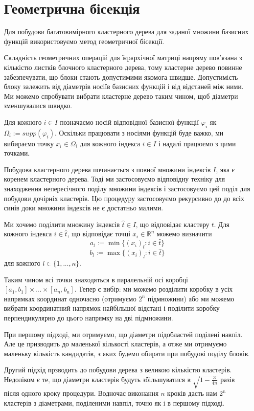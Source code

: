 \documentclass[12pt]{report}
\begin{document}
 	\section{Геометрична бісекція}
	\hspace{0.8cm} Для побудови багатовимірного кластерного дерева для заданої множини базисних функцій використовуємо метод геометричної бісекції.
	\par Складність геометричних операцій для їєрархічної матриці напряму пов'язана з кількістю листків блочного кластерного дерева, тому кластерне дерево повинне забезпечувати, що блоки стають допустимими якомога швидше. Допустимість блоку залежить від діаметрів носіїв базисних функцій і від відстаней між ними. Ми можемо спробувати вибрати кластерне дерево таким чином, щоб діаметри зменшувалися швидко.
	\par Для кожного $i\in I$ позначаємо носій відповідної базисної функції $\varphi_i$ як $\Omega_i:=supp(\varphi_i)$. Оскільки працювати з носіями функцій буде важко, ми вибираємо точку $x_i\in\Omega_i$ для кожного індекса $i\in I$ і надалі працюємо з цими точками.
	\par Побудова кластерного дерева починається з повної множини індексів $I$, яка є коренем кластерного дерева. Тоді ми застосовуємо відповідну техніку для знаходження непересічного поділу множини індексів і застосовуємо цей поділ для побудови дочірніх кластерів. Цю процедуру застосовуємо рекурсивно до до всіх синів доки множини індексів не є достатньо малими. 
	\par Ми хочемо поділити множину індексів $\hat t\in I$, що відповідає кластеру $t$. Для кожного індекса $i \in \hat t$, що відповідає точці $x_i\in\mathbb{R}^n$ можемо визначити
	$$a_l:=\min \{(x_i)_l : i\in \hat t\}$$
	$$b_l:=\max \{(x_i)_l : i\in \hat t\}$$
	для кожного $l\in \{1,...,n\}$. 
	\par Таким чином всі точки знаходяться в паралельній осі коробці $[a_1,b_1]\times...\times[a_n,b_n]$. Тепер є вибір: ми можемо розділити коробку в усіх напрямках координат одночасно (отримуємо $2^n$ підмножини) або ми можемо вибрати координатний напрямок найбільшої відстані і поділити коробку перпендикулярно до цього напрямку на дві підмножини.
	\par При першому підході, ми отримуємо, що діаметри підобластей поділені навпіл. Але це призводить до маленької кількості кластерів, а отже ми отримуємо маленьку кількість кандидатів, з яких будемо обирати при побудові поділу блоків.
	\par Другий підхід прзводить до побудови дерева з великою кількістю кластерів. Недоліком є те, що діаметри кластерів будуть збільшуватися в $\sqrt{
	1-\frac{3}{4n}}$ разів після одного кроку процедури. Водночас виконання $n$ кроків дасть нам  $2^n$ кластерів з діаметрами, поділеними навпіл, точно як і в першому підході.
\end{document}
